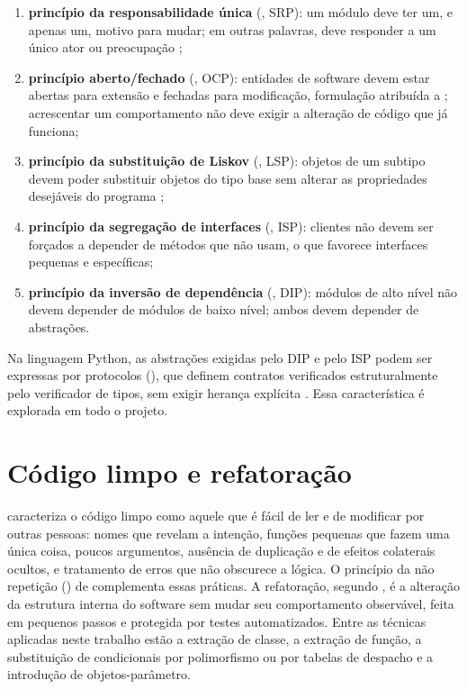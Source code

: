 \begin{enumerate}[label=\alph*)]
  \item \textbf{princípio da responsabilidade única} (, SRP): um
        módulo deve ter um, e apenas um, motivo para mudar; em outras palavras, deve responder a um único
        ator ou preocupação \cite{martin2019};
  \item \textbf{princípio aberto/fechado} (, OCP): entidades de software
        devem estar abertas para extensão e fechadas para modificação, formulação atribuída a
        \textcite{meyer1988}; acrescentar um comportamento não deve exigir a alteração de código que já
        funciona;
  \item \textbf{princípio da substituição de Liskov} (, LSP):
        objetos de um subtipo devem poder substituir objetos do tipo base sem alterar as propriedades
        desejáveis do programa \cite{liskov1994};
  \item \textbf{princípio da segregação de interfaces} (, ISP):
        clientes não devem ser forçados a depender de métodos que não usam, o que favorece interfaces
        pequenas e específicas;
  \item \textbf{princípio da inversão de dependência} (, DIP):
        módulos de alto nível não devem depender de módulos de baixo nível; ambos devem depender de
        abstrações.
\end{enumerate}

Na linguagem Python, as abstrações exigidas pelo DIP e pelo ISP podem ser expressas por protocolos
(), que definem contratos verificados estruturalmente pelo verificador de tipos,
sem exigir herança explícita \cite{pep544}. Essa característica é explorada em todo o projeto.

\section{Código limpo e refatoração}

\textcite{martin2009} caracteriza o código limpo como aquele que é fácil de ler e de modificar por
outras pessoas: nomes que revelam a intenção, funções pequenas que fazem uma única coisa, poucos
argumentos, ausência de duplicação e de efeitos colaterais ocultos, e tratamento de erros que não
obscurece a lógica. O princípio da não repetição () de
\textcite{hunt1999} complementa essas práticas. A refatoração, segundo \textcite{fowler2018}, é a
alteração da estrutura interna do software sem mudar seu comportamento observável, feita em pequenos
passos e protegida por testes automatizados. Entre as técnicas aplicadas neste trabalho estão a
extração de classe, a extração de função, a substituição de condicionais por polimorfismo ou por
tabelas de despacho e a introdução de objetos-parâmetro.

